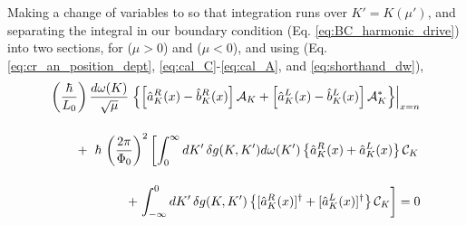 %
Making a change of variables to so that integration runs over $K'=K(\mu')$, and separating the integral in our boundary condition (Eq. \ref{eq:BC_harmonic_drive}) into two sections, for ($\mu > 0$) and ($\mu < 0$), and using (Eq. \ref{eq:cr_an_position_dept}, \ref{eq:cal_C}-\ref{eq:cal_A}, and \ref{eq:shorthand_dw}),
%
\begin{equation}\label{eq:BC_harmonic_drive}
\begin{split}
    \left(\frac{\hbar}{L_0}\right)
    \frac{d\omega(K)}{\sqrt{\mu}}
    \left.
    \left\lbrace
    \left[\hat{a}^R_K(x) - \hat{b}_K^R(x)\right]
    \mathcal{A}_K +
    \left[\hat{a}^L_K(x) - \hat{b}^L_K(x)\right]
    \mathcal{A}^*_K
    \right\rbrace
    \right|_{x=n}
    \\[4mm]
    +\hspace{2mm}
    \hbar \, \left(\frac{2\pi}{\Phi_0}\right)^2
    \left[
    \int_{0}^{\infty} dK'\,
    \delta g(K, K')
    d \omega(K')
    \left\lbrace
    \hat{a}^R_K(x) + \hat{a}_K^L(x)
    \right\rbrace
    \mathcal{C}_K\right.
    \\[4mm]
    +
    \left.
    \int_{-\infty}^{0} dK'\,
    \delta g(K, K')
    \left\lbrace
    [\hat{a}^R_K(x)]^\dagger + [\hat{a}_K^L(x)]^\dagger
    \right\rbrace
    \mathcal{C}_K
    \right]
    = 0
\end{split}
\end{equation}